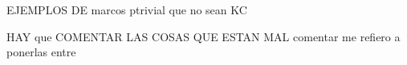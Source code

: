 \documentclass[11pt]{amsart}
\DeclareMathOperator{\pt}{pt}
\theoremstyle{plain}
\newtheorem{thm}{Theorem}[section]
\newtheorem{cor}[thm]{Corollary}
\newtheorem{prop}[thm]{Proposition}
\theoremstyle{definition}
\begin{document}








EJEMPLOS DE marcos ptrivial que no sean KC

HAY que COMENTAR LAS COSAS QUE ESTAN MAL comentar me refiero a ponerlas entre 

	
\end{document}
